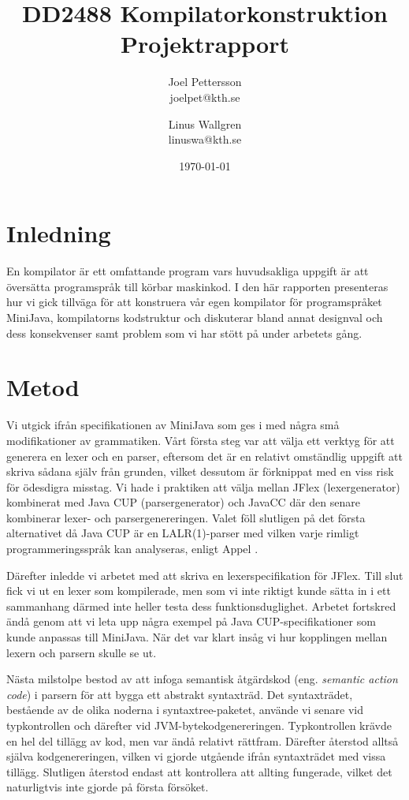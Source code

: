 \documentclass[a4paper,11pt]{article}
\title{
    {\sc DD2488 Kompilatorkonstruktion} \\ 
    Projektrapport
}
\author{
Joel Pettersson \\
joelpet@kth.se \\
\and
Linus Wallgren \\
linuswa@kth.se \\
}
\date{\today}
\newcommand{\trans}[2][eng.]{(#1 \emph{#2})}
\renewcommand{\*}[0]{\cdot}
\begin{document}
\maketitle
\newpage

\section*{Inledning}

En kompilator är ett omfattande program vars huvudsakliga uppgift är att
översätta programspråk till körbar maskinkod. I den här rapporten presenteras
hur vi gick tillväga för att konstruera vår egen kompilator för programspråket
MiniJava, kompilatorns kodstruktur och diskuterar bland annat designval och
dess konsekvenser samt problem som vi har stött på under arbetets gång.

\section*{Metod}

Vi utgick ifrån specifikationen av MiniJava som ges i \cite{appel2002} med
några små modifikationer av grammatiken. Vårt första steg var att välja ett
verktyg för att generera en lexer och en parser, eftersom det är en relativt
omständlig uppgift att skriva sådana själv från grunden, vilket dessutom är
förknippat med en viss risk för ödesdigra misstag. Vi hade i praktiken att
välja mellan JFlex (lexergenerator) kombinerat med Java CUP (parsergenerator)
och JavaCC där den senare kombinerar lexer- och parsergenereringen. Valet föll
slutligen på det första alternativet då Java CUP är en LALR(1)-parser med
vilken varje rimligt programmeringsspråk kan analyseras, enligt Appel
\cite{appel2002}.

Därefter inledde vi arbetet med att skriva en lexerspecifikation för JFlex.
Till slut fick vi ut en lexer som kompilerade, men som vi inte riktigt kunde
sätta in i ett sammanhang därmed inte heller testa dess funktionsduglighet.
Arbetet fortskred ändå genom att vi leta upp några exempel på Java
CUP-specifikationer som kunde anpassas till MiniJava. När det var klart insåg
vi hur kopplingen mellan lexern och parsern skulle se ut.

Nästa milstolpe bestod av att infoga semantisk åtgärdskod \trans{semantic
action code} i parsern för att bygga ett abstrakt syntaxträd. Det syntaxträdet,
bestående av de olika noderna i syntaxtree-paketet, använde vi senare vid
typkontrollen och därefter vid JVM-bytekodgenereringen. Typkontrollen krävde en
hel del tillägg av kod, men var ändå relativt rättfram. Därefter återstod
alltså själva kodgenereringen, vilken vi gjorde utgående ifrån syntaxträdet med
vissa tillägg. Slutligen återstod endast att kontrollera att allting fungerade,
vilket det naturligtvis inte gjorde på första försöket.
\end{document}
